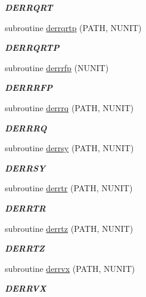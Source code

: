 \begin{DoxyCompactItemize}
\begin{DoxyCompactList}\small\item\em {\bfseries D\+E\+R\+R\+Q\+R\+T} \end{DoxyCompactList}\item 
subroutine \hyperlink{group__double__lin_ga0ac5e8e66f389be55ecfabee0b631ee5}{derrqrtp} (P\+A\+T\+H, N\+U\+N\+I\+T)
\begin{DoxyCompactList}\small\item\em {\bfseries D\+E\+R\+R\+Q\+R\+T\+P} \end{DoxyCompactList}\item 
subroutine \hyperlink{group__double__lin_gada7452d95b82cd136a6be885acca86bf}{derrrfp} (N\+U\+N\+I\+T)
\begin{DoxyCompactList}\small\item\em {\bfseries D\+E\+R\+R\+R\+F\+P} \end{DoxyCompactList}\item 
subroutine \hyperlink{group__double__lin_gaa7560ebcefd67c72091b3cf5723615ee}{derrrq} (P\+A\+T\+H, N\+U\+N\+I\+T)
\begin{DoxyCompactList}\small\item\em {\bfseries D\+E\+R\+R\+R\+Q} \end{DoxyCompactList}\item 
subroutine \hyperlink{group__double__lin_ga5b1f60f3faf4e5985ee82fa7ad0b6564}{derrsy} (P\+A\+T\+H, N\+U\+N\+I\+T)
\begin{DoxyCompactList}\small\item\em {\bfseries D\+E\+R\+R\+S\+Y} \end{DoxyCompactList}\item 
subroutine \hyperlink{group__double__lin_gacb2f860a23af38e4d138f5980f8650a0}{derrtr} (P\+A\+T\+H, N\+U\+N\+I\+T)
\begin{DoxyCompactList}\small\item\em {\bfseries D\+E\+R\+R\+T\+R} \end{DoxyCompactList}\item 
subroutine \hyperlink{group__double__lin_ga65abb3f60faa21a742da22f6c62c631f}{derrtz} (P\+A\+T\+H, N\+U\+N\+I\+T)
\begin{DoxyCompactList}\small\item\em {\bfseries D\+E\+R\+R\+T\+Z} \end{DoxyCompactList}\item 
subroutine \hyperlink{group__double__lin_gad53b9568f84ca78c561b3b9d220daf59}{derrvx} (P\+A\+T\+H, N\+U\+N\+I\+T)
\begin{DoxyCompactList}\small\item\em {\bfseries D\+E\+R\+R\+V\+X} \end{DoxyCompactList}\item 

\end{DoxyCompactItemize}
